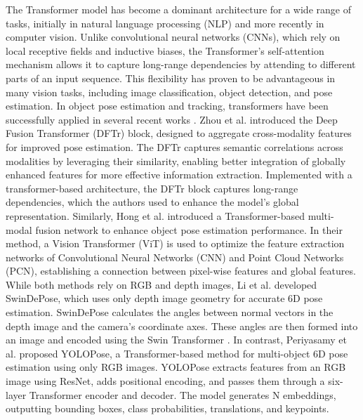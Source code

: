 The Transformer model \cite{vaswani2017attention} has become a dominant architecture for a wide range of tasks, initially in natural language processing (NLP) and more recently in computer vision. Unlike convolutional neural networks (CNNs), which rely on local receptive fields and inductive biases, the Transformer's self-attention mechanism allows it to capture long-range dependencies by attending to different parts of an input sequence. This flexibility has proven to be advantageous in many vision tasks, including image classification, object detection, and pose estimation. In object pose estimation and tracking, transformers have been successfully applied in several recent works \cite{zhou2023deep, hong2024transformer, li2023depth, periyasamy2023yolopose}. Zhou et al. \cite{zhou2023deep} introduced the Deep Fusion Transformer (DFTr) block, designed to aggregate cross-modality features for improved pose estimation. The DFTr captures semantic correlations across modalities by leveraging their similarity, enabling better integration of globally enhanced features for more effective information extraction. Implemented with a transformer-based architecture, the DFTr block captures long-range dependencies, which the authors used to enhance the model's global representation. Similarly, Hong et al. \cite{hong2024transformer} introduced a Transformer-based multi-modal fusion network to enhance object pose estimation performance. In their method, a Vision Transformer (ViT) is used to optimize the feature extraction networks of Convolutional Neural Networks (CNN) and Point Cloud Networks (PCN), establishing a connection between pixel-wise features and global features. While both methods \cite{zhou2023deep, hong2024transformer} rely on RGB and depth images, Li et al. \cite{li2023depth} developed SwinDePose, which uses only depth image geometry for accurate 6D pose estimation. SwinDePose calculates the angles between normal vectors in the depth image and the camera's coordinate axes. These angles are then formed into an image and encoded using the Swin Transformer \cite{liu2021swin}. In contrast, Periyasamy et al. proposed YOLOPose, a Transformer-based method for multi-object 6D pose estimation using only RGB images. YOLOPose extracts features from an RGB image using ResNet, adds positional encoding, and passes them through a six-layer Transformer encoder and decoder. The model generates N embeddings, outputting bounding boxes, class probabilities, translations, and keypoints.

